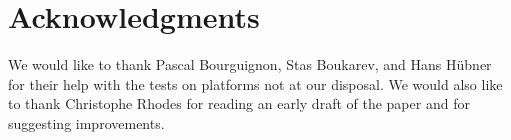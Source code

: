 \section{Acknowledgments} 

We would like to thank Pascal Bourguignon, Stas Boukarev, and Hans
Hübner for their help with the tests on platforms not at our disposal.
We would also like to thank Christophe Rhodes for reading an early
draft of the paper and for suggesting improvements. 

